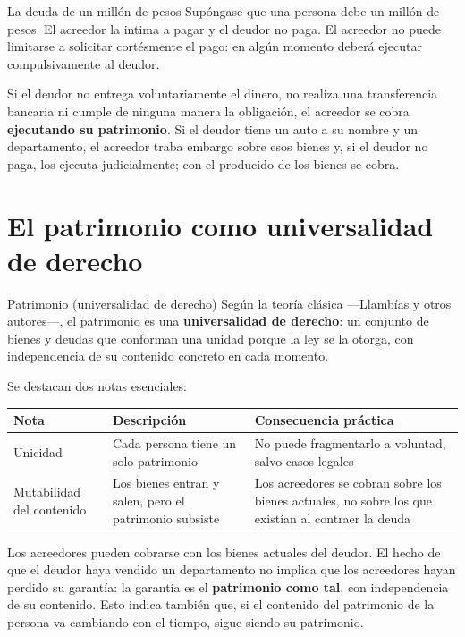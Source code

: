\documentclass[12pt,oneside]{book}
\newenvironment{tabla}{%
    \par\medskip\begingroup\small\renewcommand{\arraystretch}{1.3}\noindent\ignorespaces
}{%
    \par\endgroup\medskip
}
\begin{document}
\begin{example}{La deuda de un millón de pesos}
Supóngase que una persona debe un millón de pesos. El acreedor la intima a pagar y el deudor no paga. El acreedor no puede limitarse a solicitar cortésmente el pago: en algún momento deberá ejecutar compulsivamente al deudor.

Si el deudor no entrega voluntariamente el dinero, no realiza una transferencia bancaria ni cumple de ninguna manera la obligación, el acreedor se cobra \textbf{ejecutando su patrimonio}. Si el deudor tiene un auto a su nombre y un departamento, el acreedor traba embargo sobre esos bienes y, si el deudor no paga, los ejecuta judicialmente; con el producido de los bienes se cobra.
\end{example}

\section{El patrimonio como universalidad de derecho}

\begin{definition}{Patrimonio (universalidad de derecho)}
Según la teoría clásica ---Llambías y otros autores---, el patrimonio es una \textbf{universalidad de derecho}: un conjunto de bienes y deudas que conforman una unidad porque la ley se la otorga, con independencia de su contenido concreto en cada momento.
\end{definition}

Se destacan dos notas esenciales:

\begin{tabla}
\begin{tabularx}{\textwidth}{B{3.0cm}YY}
\toprule
Nota & \textbf{Descripción} & \textbf{Consecuencia práctica} \\
\midrule
Unicidad & Cada persona tiene un solo patrimonio & No puede fragmentarlo a voluntad, salvo casos legales \\
Mutabilidad del contenido & Los bienes entran y salen, pero el patrimonio subsiste & Los acreedores se cobran sobre los bienes actuales, no sobre los que existían al contraer la deuda \\
\bottomrule
\end{tabularx}
\end{tabla}

Los acreedores pueden cobrarse con los bienes actuales del deudor. El hecho de que el deudor haya vendido un departamento no implica que los acreedores hayan perdido su garantía: la garantía es el \textbf{patrimonio como tal}, con independencia de su contenido. Esto indica también que, si el contenido del patrimonio de la persona va cambiando con el tiempo, sigue siendo su patrimonio.
\end{document}
